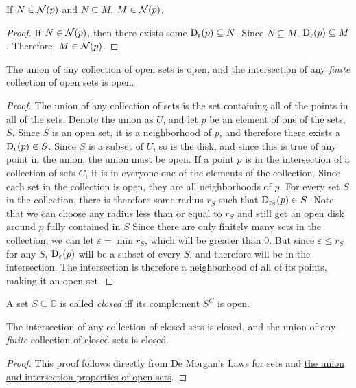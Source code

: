\documentclass{refbook}
\begin{document}
\begin{lemma}
If $N \in \nbhd{p}$ and $N \subseteq M$, $M \in \nbhd{p}$.
\end{lemma}
\begin{proof}
If $N \in \nbhd{p}$, then there exists some $\disk{p}{r} \subseteq N$. Since $N \subseteq M$, $\disk{p}{r} \subseteq M$. Therefore, $M \in \nbhd{p}$.
\end{proof}
\begin{lemma}
The union of any collection of open sets is open, and the intersection of any \emph{finite} collection of open sets is open.
\end{lemma}
\begin{proof}
The union of any collection of sets is the set containing all of the points in all of the sets. Denote the union as $U$, and let $p$ be an element of one of the sets, $S$. Since $S$ is an open set, it is a neighborhood of $p$, and therefore there exists a $\disk{p}{r} \in S$.
Since $S$ is a subset of $U$, so is the disk, and since this is true of any point in the union, the union must be open.
If a point $p$ is in the intersection of a collection of sets $C$, it is in everyone one of the elements of the collection. Since each set in the collection is open, they are all neighborhoods of $p$. For every set $S$ in the collection, there is therefore some radius $r_S$ such that $\disk{p}{r_S} \in S$. Note that we can choose any radius less than or equal to $r_S$ and still get an open disk around $p$ fully contained in $S$
Since there are only finitely many sets in the collection, we can let $\varepsilon = \min r_S$, which will be greater than $0$. But since $\varepsilon \leq r_S$ for any $S$, $\disk{p}{\varepsilon}$ will be a subset of every $S$, and therefore will be in the intersection. The intersection is therefore a neighborhood of all of its points, making it an open set. 
\end{proof}
\begin{definition}
A set $S \subseteq \mathbb{C}$ is called \emph{closed} iff its complement $S^C$ is open.
\end{definition}
\begin{lemma}
The intersection of any collection of closed sets is closed, and the union of any \emph{finite} collection of closed sets is closed.
\end{lemma}
\begin{proof}
This proof follows directly from De Morgan's Laws for sets and \hyperlink{Properties of Open Sets}{the union and intersection properties of open sets}.
\end{proof}
\end{document}
